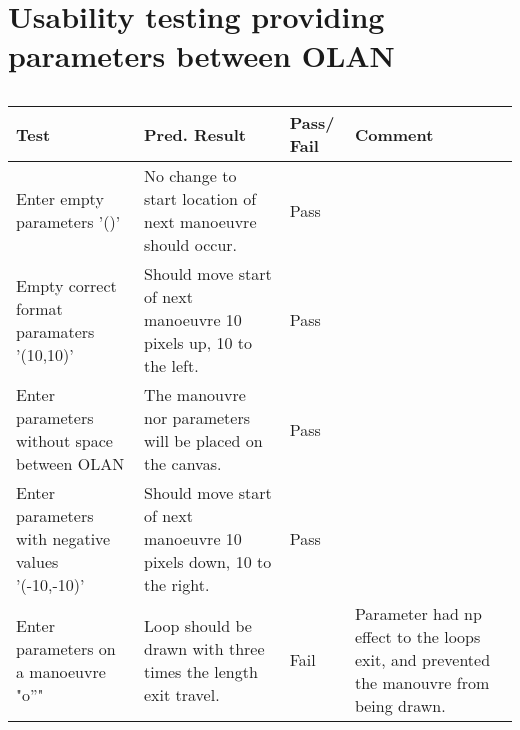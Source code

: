 \section{Usability testing providing parameters between OLAN}
\begin{table}[h]
\begin{tabular}{|p{4.5cm}|p{4.5cm}|p{2cm}|p{2.5cm}|}
\hline
\textbf{Test} & \textbf{Pred. Result} & \textbf{Pass/ Fail} & \textbf{Comment}                        \\ \hline
Enter empty parameters '()'    &  No change to start location of next manoeuvre should occur.  &     Pass       &     \\ \hline
Empty correct format paramaters '(10,10)'    &  Should move start of next manoeuvre 10 pixels up, 10 to the left.  &      Pass      &     \\ \hline
Enter parameters without space between OLAN    & The manouvre nor parameters will be placed on the canvas.   &        Pass    &     \\ \hline
Enter parameters with negative values '(-10,-10)'    &  Should move start of next manoeuvre 10 pixels down, 10 to the right.  &       Pass     &     \\ \hline
Enter parameters on a manoeuvre "o''"  &  Loop should be drawn with three times the length exit travel.  &        Fail    &   Parameter had np effect to the loops exit, and prevented the manouvre from being drawn.  \\ \hline
\end{tabular}
\label{test:parameters}
\caption{}
\end{table}
